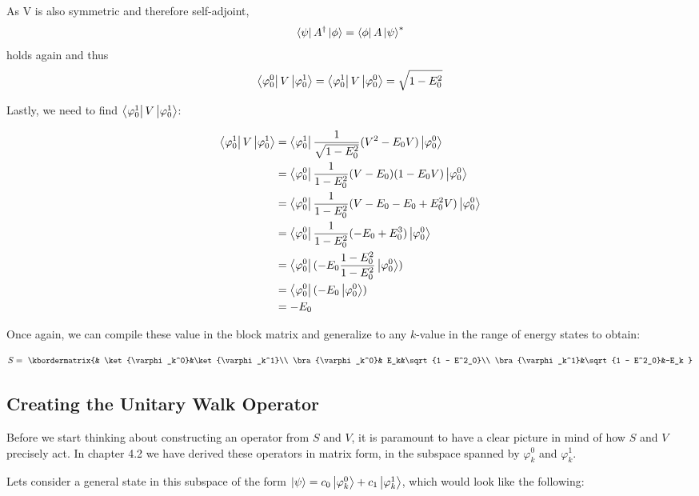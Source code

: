 As V is also symmetric and therefore self-adjoint, $$\left\langle{\psi}\right\vert A^{\dagger}\left\vert{\phi}\right\rangle= \left\langle{\phi}\right\vert A \left\vert{\psi}\right\rangle^{*}$$ holds again and thus $$\left\langle{\varphi_0^0}\right\vert V\left\vert{\varphi_0^1}\right\rangle = \left\langle{\varphi_0^1}\right\vert V\left\vert{\varphi_0^0}\right\rangle = \sqrt{1 - E^2_0}$$

Lastly, we need to find $\left\langle{\varphi_0^1}\right\vert V\left\vert{\varphi_0^1}\right\rangle$:

\begin{align*}
\left\langle{\varphi_0^1}\right\vert V\left\vert{\varphi_0^1}\right\rangle &= \left\langle{\varphi_0^1}\right\vert  \frac{1}{\sqrt{1 - E^2_0}} (V^2 - E_0V) \left\vert{\varphi_0^0}\right\rangle\\
&= \left\langle{\varphi_0^0}\right\vert \frac{1}{1 - E^2_0} (V - E_0)(1 - E_0V)\left\vert{\varphi_0^0}\right\rangle\\
&= \left\langle{\varphi_0^0}\right\vert \frac{1}{1 - E^2_0} (V - E_0 - E_0 + E_0^2V)\left\vert{\varphi_0^0}\right\rangle\\
&= \left\langle{\varphi_0^0}\right\vert \frac{1}{1 - E^2_0} (-E_0 + E_0^3)\left\vert{\varphi_0^0}\right\rangle\\
&= \left\langle{\varphi_0^0}\right\vert (- E_0 \frac{1 - E^2_0}{1 - E^2_0}\left\vert{\varphi_0^0}\right\rangle)\\
&= \left\langle{\varphi_0^0}\right\vert (- E_0 \left\vert{\varphi_0^0}\right\rangle)\\
&= - E_0
\end{align*}

Once again, we can compile these value in the block matrix and generalize to any $k$-value in the range of energy states to obtain:

\begin{equation}
S = \
\kbordermatrix{& \ket{\varphi_k^0}&\ket{\varphi_k^1}\\
\bra{\varphi_k^0}& E_k&\sqrt{1 - E^2_0}\\
\bra{\varphi_k^1}&\sqrt{1 - E^2_0}&-E_k
}
\end{equation}

\subsection{Creating the Unitary Walk Operator}

Before we start thinking about constructing an operator from $S$ and $V$, it is paramount to have a clear picture in mind of how $S$ and $V$ precisely act. In chapter 4.2 we have derived these operators in matrix form, in the subspace spanned by $\varphi_k^0$ and $\varphi_k^1$.

Lets consider a general state in this subspace of the form $\left\vert{\psi}\right\rangle = c_0 \left\vert{\varphi_k^0}\right\rangle + c_1 \left\vert{\varphi_k^1}\right\rangle$, which would look like the following:

